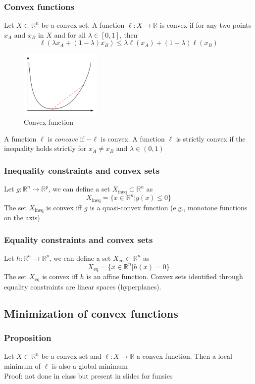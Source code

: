 \documentclass[openany]{book}
\newcommand{\R}{\mathbb{R}} %
\theoremstyle{definition}
\theoremstyle{remark}
\begin{document}
\subsubsection{Convex functions}
Let $X \subset \R^n$ be a convex set. A function $\ell:X\to\R$ is convex if for any two points $x_A$ and $x_B$ in $X$ and for all $\lambda\in[0,1]$, then 
\[
    \ell(\lambda x_A + (1-\lambda)x_B)\leq \lambda\ell(x_A)+ (1-\lambda)\ell(x_B)
\]
\begin{figure}[ht]
    \centering
    \includegraphics[width=0.35\textwidth]{cvxfcn}
    \caption{Convex function}
\end{figure}

A function $\ell$ is \emph{concave} if $-\ell$ is convex. A function $\ell$ is strictly convex if the inequality holds strictly for $x_A\neq x_B$ and $\lambda\in(0,1)$
\subsubsection{Inequality constraints and convex sets}
Let $g:\R^n\to\R^p$, we can define a set $X_{\text{ineq}}\subset \R^n$ as
\[
    X_{\text{ineq}} = \{x\in\R^n|g(x)\leq 0\}
\]
The set $X_{\text{ineq}}$ is convex iff $g$ is a quasi-convex function (e.g., monotone functions on the axis)
\subsubsection{Equality constraints and convex sets}
Let $h:\R^n\to\R^p$, we can define a set $X_{\text{eq}}\subset \R^n$ as
\[
    X_{\text{eq}} = \{x\in\R^n|h(x)= 0\}
\]
The set $X_{\text{eq}}$ is convex iff $h$ is an affine function. Convex sets identified through equality constraints are linear spaces (hyperplanes).



\subsection{Minimization of convex functions}
\subsubsection{Proposition}
Let $X\subset\R^n$ be a convex set and $\ell: X\to\R$ a convex function. Then a local minimum of $\ell$ is also a global minimum \\
Proof: not done in class but present in slides for funsies
\end{document}
